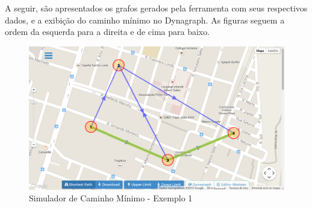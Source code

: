 A seguir, são apresentados os grafos gerados pela ferramenta com seus respectivos dados,
e a exibição do caminho mínimo no Dynagraph. As figuras seguem a ordem da esquerda para a direita e
de cima para baixo.

\begin{figure}[htbp]
\centering
 \includegraphics[width=.70\textwidth]{chapters/fig/validacao/ex1.png}
\caption{Simulador de Caminho Mínimo - Exemplo 1}
\label{fig:ex1}
\end{figure}
\FloatBarrier

